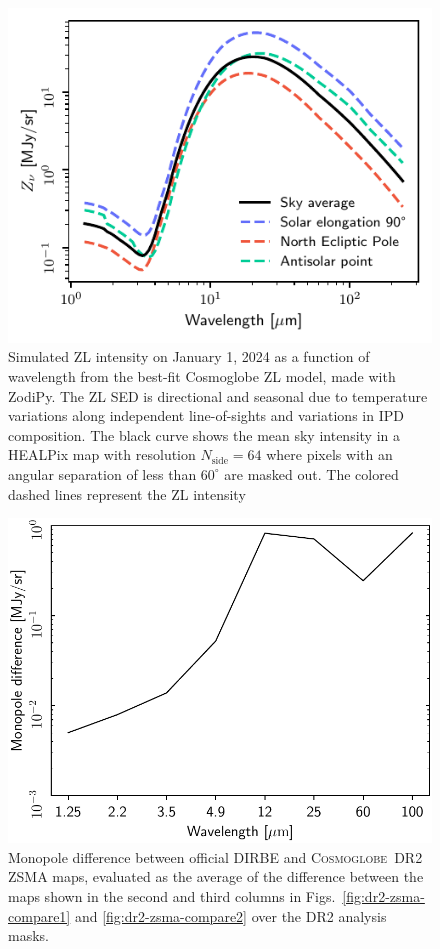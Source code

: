 \documentclass[twocolumn]{aa}
\newcommand{\cosmoglobe}{\textsc{Cosmoglobe}}
\begin{document}
\begin{figure}
    \centering
    \includegraphics[width=\columnwidth]{figs/zodi_intensity.pdf}
    \caption{Simulated ZL intensity on January 1, 2024 as a function of wavelength from the best-fit 
    Cosmoglobe ZL model, made with ZodiPy. The ZL SED is directional 
    and seasonal due to temperature variations along independent line-of-sights and variations in IPD composition. 
    The black curve shows the mean sky intensity in a HEALPix map with resolution
    $N_\mathrm{side}= 64$ where pixels with an angular separation of less than
    $60^\circ$ are masked out. The colored dashed lines represent the ZL 
    intensity
    }
    \label{fig:zodi-intensity}
\end{figure}


\begin{figure}
    \centering
    \includegraphics[width=\linewidth]{figs/zodi_mean_diff_DIRBE_DR2.pdf}
    \caption{Monopole difference between official DIRBE and
      \cosmoglobe\ DR2 ZSMA maps, evaluated as the average of the
      difference between the maps shown in the second and third
      columns in Figs.~\ref{fig:dr2-zsma-compare1} and
      \ref{fig:dr2-zsma-compare2} over the DR2 analysis masks.}
    \label{fig:zsma_mean}
\end{figure}
\end{document}
